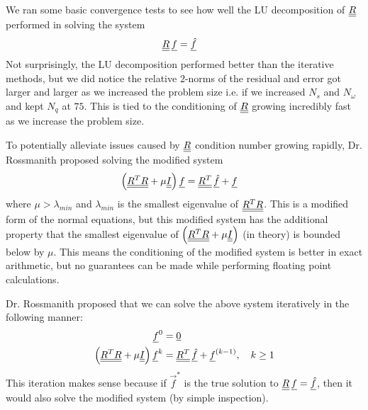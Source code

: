 \par 
We ran some basic convergence tests to see how well the LU decomposition of ${\underline{\underline{R}}}$ performed in solving the system 
\begin{align*}
	{\underline{\underline{R}}} \, {\underline{f}} & = {\underline{\hat{f}}}
\end{align*}
Not surprisingly, the LU decomposition performed better than the iterative methods, but we did notice the relative $2$-norms of the residual and error got larger and larger as we increased the problem size i.e. if we increased  $N_{s}$ and $N_{\omega}$ and kept $N_{q}$ at $75$.
This is tied to the conditioning of ${\underline{\underline{R}}}$ growing incredibly fast as we increase the problem size.
\par 
To potentially alleviate issues caused by ${\underline{\underline{R}}}$ condition number growing rapidly, Dr. Rossmanith proposed solving the modified system
\begin{align*}
	\Big( {\underline{\underline{R^{T} R}}} + \mu {\underline{\underline{I}}} \Big) \, {\underline{f}} & = {\underline{\underline{R^{T}}}} \, {\underline{\hat{f}}} + {\underline{f}}
\end{align*} 
where $\mu > \lambda_{min}$ and $\lambda_{min}$ is the smallest eigenvalue of ${\underline{\underline{R^{T} R}}}$.
This is a modified form of the normal equations, but this modified system has the additional property that the smallest eigenvalue of $\Big( {\underline{\underline{R^{T}R}}} + \mu {\underline{\underline{I}}} \Big)$ (in theory) is bounded below by $\mu$.
This means the conditioning of the modified system is better in exact arithmetic, but no guarantees can be made while performing floating point calculations.
\par 
Dr. Rossmanith proposed that we can solve the above system iteratively in the following manner:
\begin{align*}
	{\underline{f}}^{0} & = {\underline{0}} \\
	\Big( {\underline{\underline{R^{T} R}}} + \mu {\underline{\underline{I}}} \Big) \, {\underline{f}}^{k} & = {\underline{\underline{R^{T}}}} \, {\underline{\hat{f}}} + {\underline{f}}^{(k-1)}, \quad k \geq 1
\end{align*}
This iteration makes sense because if $\vec{f}^{*}$ is the true solution to ${\underline{\underline{R}}} \, {\underline{f}} = {\underline{\hat{f}}}$, then it would also solve the modified system (by simple inspection).